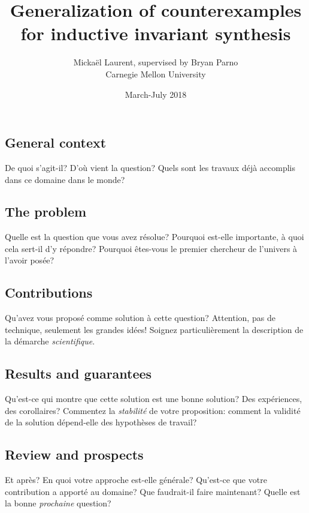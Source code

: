 \documentclass{article}
\newenvironment{point}[1]%
{\subsection*{#1}}%
{}
\begin{document}

\title{Generalization of counterexamples for inductive invariant synthesis}

\author{Mickaël Laurent, supervised by Bryan Parno\\Carnegie Mellon University}

\date{March-July 2018}

\maketitle

\pagestyle{empty} %
\thispagestyle{empty}



\begin{point}{General context}
  
  De quoi s'agit-il? D'où vient la question? Quels sont les travaux
  déjà accomplis dans ce domaine dans le monde?

\end{point}

\begin{point}{The problem}
  
  Quelle est la question que vous avez résolue? Pourquoi est-elle
  importante, à quoi cela sert-il d'y répondre?  Pourquoi êtes-vous
  le premier chercheur de l'univers à l'avoir posée?

\end{point}

\begin{point}{Contributions}

  Qu'avez vous proposé comme solution à cette question? Attention, pas
  de technique, seulement les grandes idées! Soignez particulièrement
  la description de la démarche \emph{scientifique}.
 
\end{point}

\begin{point}{Results and guarantees}

  Qu'est-ce qui montre que cette solution est une bonne solution? Des
  expériences, des corollaires? Commentez la \emph{stabilité} de votre
  proposition: comment la validité de la solution dépend-elle des
  hypothèses de travail?

\end{point}


\begin{point}{Review and prospects}
  
  Et après? En quoi votre approche est-elle générale? Qu'est-ce que
  votre contribution a apporté au domaine? Que faudrait-il faire
  maintenant? Quelle est la bonne \emph{prochaine} question?

\end{point}
\end{document}
